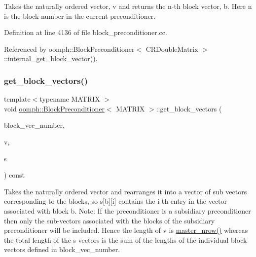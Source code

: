 Takes the naturally ordered vector, v and returns the n-\/th block vector, b. Here n is the block number in the current preconditioner. 



Definition at line 4136 of file block\+\_\+preconditioner.\+cc.



Referenced by oomph\+::\+Block\+Preconditioner$<$ C\+R\+Double\+Matrix $>$\+::internal\+\_\+get\+\_\+block\+\_\+vector().

\mbox{\label{classoomph_1_1BlockPreconditioner_ad356946d5de4f0817cdf8793fa3cdc74}} 
\subsubsection{\texorpdfstring{get\+\_\+block\+\_\+vectors()}{get\_block\_vectors()}\hspace{0.1cm}{\footnotesize\ttfamily [1/2]}}
{\footnotesize\ttfamily template$<$typename M\+A\+T\+R\+IX $>$ \\
void \hyperlink{classoomph_1_1BlockPreconditioner}{oomph\+::\+Block\+Preconditioner}$<$ M\+A\+T\+R\+IX $>$\+::get\+\_\+block\+\_\+vectors (\begin{DoxyParamCaption}\item[{const \hyperlink{classoomph_1_1Vector}{Vector}$<$ unsigned $>$ \&}]{block\+\_\+vec\+\_\+number,  }\item[{const \hyperlink{classoomph_1_1DoubleVector}{Double\+Vector} \&}]{v,  }\item[{\hyperlink{classoomph_1_1Vector}{Vector}$<$ \hyperlink{classoomph_1_1DoubleVector}{Double\+Vector} $>$ \&}]{s }\end{DoxyParamCaption}) const}



Takes the naturally ordered vector and rearranges it into a vector of sub vectors corresponding to the blocks, so s\mbox{[}b\mbox{]}\mbox{[}i\mbox{]} contains the i-\/th entry in the vector associated with block b. Note\+: If the preconditioner is a subsidiary preconditioner then only the sub-\/vectors associated with the blocks of the subsidiary preconditioner will be included. Hence the length of v is \hyperlink{classoomph_1_1BlockPreconditioner_a3e5b553f65e6c25354a5c908d507e8ee}{master\+\_\+nrow()} whereas the total length of the s vectors is the sum of the lengths of the individual block vectors defined in block\+\_\+vec\+\_\+number. 



